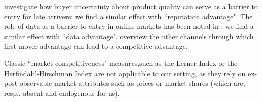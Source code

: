 \cite{schmalensee1982product, bagwell1990informational} investigate how buyer uncertainty about product quality can serve as a barrier to entry for late arrivers; we find a similar effect with ``reputation advantage". The role of data as a barrier to entry in online markets has been noted in \cite{de2020data}; we find a similar effect with ``data advantage". \citet{kerin1992first} overview the other channels through which first-mover advantage can lead to a competitive advantage.




Classic ``market competitiveness" measures,such as the Lerner Index or the Herfindahl-Hirschman Index
\citep{tirole1988theory} are not applicable to our setting, as they rely on ex-post observable market attributes such as prices or market shares (which are, resp., absent and endogenous for us).



